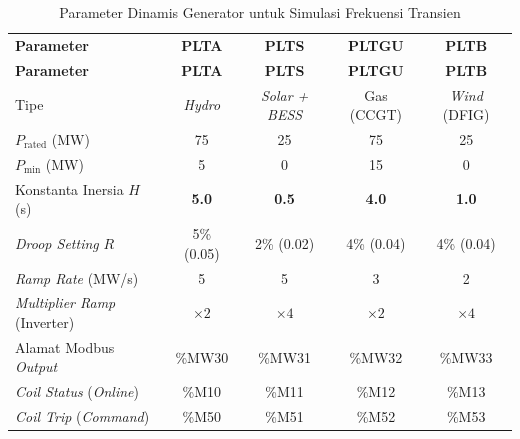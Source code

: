 \begin{enumerate}
\begin{longtable}{|p{4.8cm}|c|c|c|c|}
    \caption{Parameter Dinamis Generator untuk Simulasi Frekuensi Transien}
    \label{tab:gen_dinamis}
    \vspace{-0.75em}\\
    \hline
    \textbf{Parameter} & \textbf{PLTA} & \textbf{PLTS} & \textbf{PLTGU} & \textbf{PLTB} \\ \hline
    \endfirsthead
    \hline
    \textbf{Parameter} & \textbf{PLTA} & \textbf{PLTS} & \textbf{PLTGU} & \textbf{PLTB} \\ \hline
    \endhead
    Tipe                                & \textit{Hydro}        & \textit{Solar + BESS} & Gas (CCGT)   & \textit{Wind} (DFIG)  \\ \hline
    $P_{\mathrm{rated}}$ (MW)           & 75           & 25           & 75           & 25           \\ \hline
    $P_{\min}$ (MW)                     & 5            & 0            & 15           & 0            \\ \hline
    Konstanta Inersia $H$ (s)           & \textbf{5.0} & \textbf{0.5} & \textbf{4.0} & \textbf{1.0} \\ \hline
    \textit{Droop Setting} $R$                   & 5\% (0.05)   & 2\% (0.02)   & 4\% (0.04)   & 4\% (0.04)   \\ \hline
    \textit{Ramp Rate} (MW/s)                    & 5            & 5            & 3            & 2            \\ \hline
    \textit{Multiplier Ramp} (Inverter)          & $\times 2$   & $\times 4$   & $\times 2$   & $\times 4$   \\ \hline
    Alamat Modbus \textit{Output}                & \%MW30       & \%MW31       & \%MW32       & \%MW33       \\ \hline
    \textit{Coil Status} (\textit{Online})       & \%M10        & \%M11        & \%M12        & \%M13        \\ \hline
    \textit{Coil Trip} (\textit{Command})        & \%M50        & \%M51        & \%M52        & \%M53        \\ \hline
\end{longtable}


\end{enumerate}

